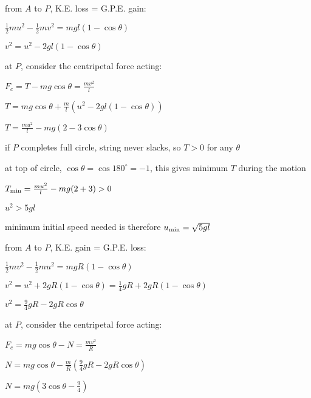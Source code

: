 from $A$ to $P$, K.E. loss = G.P.E. gain:

{\centering
	$\frac{1}{2}mu^2 - \frac{1}{2}mv^2 = mgl(1-\cos\theta)$
	
	$v^2 = u^2 - 2gl(1-\cos\theta)$
	
}

at $P$, consider the centripetal force acting:

{\centering
	$F_c = T - mg\cos\theta = \frac{mv^2}{l}$
	
	$T = mg\cos\theta + \frac{m}{l}\left(u^2 - 2gl(1-\cos\theta)\right)$
	
	$T = \frac{mu^2}{l} - mg(2 - 3\cos\theta) $
	
}

if $P$ completes full circle, string never slacks, so $T>0$ for any $\theta$

at top of circle, $\cos \theta = \cos 180^\circ = -1$, this gives minimum $T$ during the motion

{\centering
	$T_{\text{min}} = \frac{mu^2}{l} - mg(2 + 3) > 0$
	
	$u^2 > 5gl$
	
}

minimum initial speed needed is therefore $u_{\text{min}} = \sqrt{5gl}$ \eoe


 \label{ex-slidingP}


from $A$ to $P$, K.E. gain = G.P.E. loss:

{\centering
$\frac{1}{2}mv^2 - \frac{1}{2}mu^2 = mgR(1-\cos\theta)$

$v^2 = u^2 + 2gR(1-\cos\theta) = \frac{1}{4}gR + 2gR(1-\cos\theta)$

$v^2 = \frac{9}{4}gR -2gR\cos\theta$

}

at $P$, consider the centripetal force acting:

{\centering
	$F_c = mg\cos\theta - N = \frac{mv^2}{R}$
	
	$N = mg\cos\theta - \frac{m}{R}\left(\frac{9}{4}gR -2gR\cos\theta\right)$
	
	$N = mg\left(3\cos\theta -\frac{9}{4}\right)$
	
}

